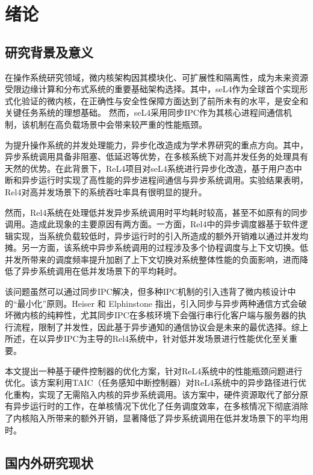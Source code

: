 \chapter{绪论}

\section{研究背景及意义}

在操作系统研究领域，微内核架构因其模块化、可扩展性和隔离性，成为未来资源受限边缘计算和分布式系统的重要基础架构选择\cite{nandy2024resource}。其中，seL4作为全球首个实现形式化验证的微内核，在正确性与安全性保障方面达到了前所未有的水平，是安全和关键任务系统的理想基础\cite{heiser2024lionsos}。
然而，seL4采用同步IPC作为其核心进程间通信机制，该机制在高负载场景中会带来较严重的性能瓶颈\cite{mergendahl2022thundering}。

为提升操作系统的并发处理能力，异步化改造成为学术界研究的重点方向。其中，异步系统调用具备非阻塞、低延迟等优势，在多核系统下对高并发任务的处理具有天然的优势。在此背景下，ReL4项目\cite{rel4_kernel}对seL4系统进行异步化改造，基于用户态中断和异步运行时实现了高性能的异步进程间通信与异步系统调用。实验结果表明，Rel4对高并发场景下的系统吞吐率具有很明显的提升。

然而，Rel4系统在处理低并发异步系统调用时平均耗时较高，甚至不如原有的同步调用。造成此现象的主要原因有两方面。一方面，Rel4中的异步调度器基于软件逻辑实现，当系统负载较低时，异步运行时的引入所造成的额外开销难以通过并发均摊。另一方面，该系统中异步系统调用的过程涉及多个协程调度与上下文切换。低并发所带来的调度频率提升加剧了上下文切换对系统整体性能的负面影响，进而降低了异步系统调用在低并发场景下的平均耗时。

该问题虽然可以通过同步IPC解决，但多种IPC机制的引入违背了微内核设计中的“最小化”原则。Heiser 和 Elphinstone 指出，引入同步与异步两种通信方式会破坏微内核的纯粹性，尤其同步IPC在多核环境下会强行串行化客户端与服务器的执行流程，限制了并发性，因此基于异步通知的通信协议会是未来的最优选择\cite{heiser2013from}。综上所述，在以异步IPC为主导的Rel4系统中，针对低并发场景进行性能优化至关重要。

本文提出一种基于硬件控制器的优化方案，针对ReL4系统中的性能瓶颈问题进行优化。该方案利用TAIC（任务感知中断控制器）对ReL4系统中的异步路径进行优化重构，实现了无需陷入内核的异步系统调用。该方案中，硬件资源取代了部分原有异步运行时的工作，在单核情况下优化了任务调度效率，在多核情况下彻底消除了内核陷入所带来的额外开销，显著降低了异步系统调用在低并发场景下的平均用时。

\section{国内外研究现状}

